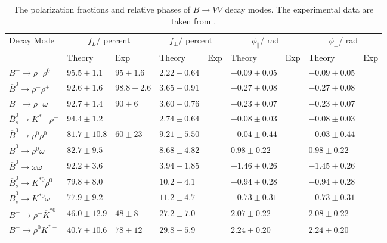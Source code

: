 \documentclass[11pt]{article}
\begin{document}
\begin{table}[tbh!]
\begin{center}
\caption{The polarization fractions and  relative phases of $\overline B \to VV$ decay modes.  The  experimental data are taken from \cite{Agashe:2014kda}. }\label{Tab:pf}
\renewcommand*{\arraystretch}{0.8}
{\footnotesize
\begin{tabular}{l| l |l|l| l|l| l|l| l }
 \hline
 \hline
 \multirow{2}{*}{Decay Mode} &
 \multicolumn{2}{c|}{$f_L$/ percent} &
 \multicolumn{2}{c|}{$f_\perp$/ percent}&
 \multicolumn{2}{c|}{$\phi_\parallel$/ rad}&
 \multicolumn{2}{c}{$\phi_\perp$/ rad} \\
 \cline{2-9}
  & Theory  & Exp & Theory    & Exp& Theory    & Exp& Theory    & Exp \\
 \hline
$B^-\to\rho^-\rho^0$                & $95.5\pm1.1$ & $95\pm1.6$      & $2.22\pm0.64$ &      &$-0.09\pm0.05$ &       & $-0.09\pm0.05$  \\
$\overline B^0\to\rho^-\rho^+$      & $92.6\pm1.6$ & $98.8\pm2.6$    & $3.65\pm0.91$ &      & $-0.27\pm0.08$ &     & $-0.27\pm0.08$  \\
$B^-\to\rho^-\omega$                & $92.7\pm1.4$ & $90\pm6$         & $3.60\pm0.76$ &      & $-0.23\pm0.07$ &    & $-0.23\pm0.07$ \\
$\overline B_s^0\to K^{*+}\rho^-$  & $94.4\pm1.2$ &   & $2.74\pm0.64$ &  & $ -0.08\pm0.03$    &   & $-0.08\pm0.03$\\
\hline
$\overline B^0\to\rho^0\rho^0$      & $81.7\pm10.8$ & $60\pm23$        & $9.21\pm5.50$ &      & $-0.04\pm0.44$ &     & $-0.03\pm0.44$ \\
$\overline B^0\to\rho^0\omega$      & $82.7\pm9.5$ &                  & $ 8.68\pm4.82$ &     & $0.98\pm0.22$ &     & $0.98\pm0.22$ \\
$\overline B^0\to\omega\omega$      & $92.2\pm3.6$ &                  & $3.94\pm1.85$ &      & $-1.46\pm0.26$ &     & $-1.45\pm0.26$ \\
$\overline B_s^0\to K^{*0}\rho^0$  & $79.8\pm8.0$ &    & $10.2\pm4.1$ &   & $-0.94\pm0.28$    &   & $-0.94\pm0.28$\\
$\overline B_s^0\to K^{*0}\omega$  & $77.9\pm9.2$ &    & $11.2\pm4.7$ &   & $-0.73\pm0.31$    &   & $-0.73\pm0.31$\\
\hline
$B^-\to\rho^-\overline K^{*0}$              & $46.0\pm12.9$ & $48\pm8$    & $27.2\pm7.0$ &      & $2.07\pm0.22$ &      & $2.08\pm0.22$\\
$B^-\to\rho^0 K^{*-}$                       & $40.7\pm10.6$ & $78\pm12$    & $29.8\pm5.9$ &      & $2.24\pm0.20$ &     & $2.24\pm0.20$\\

\end{tabular}}
\end{center}
\end{table}
\end{document}
